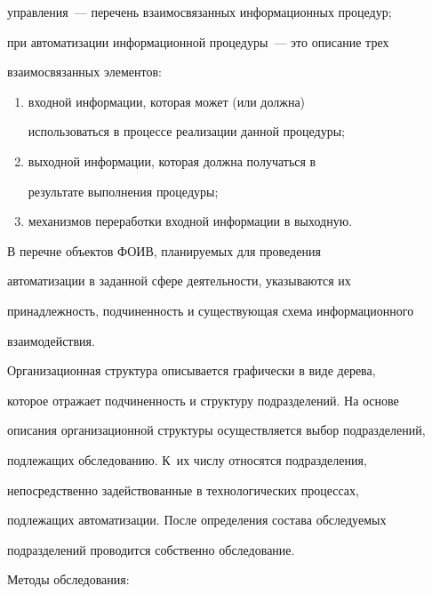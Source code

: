 управ\-ле\-ния~--- перечень взаимосвязанных информационных процедур; 


при автоматизации информационной процедуры~--- это описание трех 


взаимосвязанных элементов:


       \begin{enumerate}[(1)]


       \item входной информации, которая может (или должна) 


использоваться в процессе реализации данной процедуры;


       \item  выходной информации, которая должна получаться в 


результате выполнения процедуры;


       \item механизмов переработки входной информации в выходную.


       \end{enumerate}


       


      В перечне объектов ФОИВ, планируемых для проведения 


автоматизации в заданной сфере деятельности, указываются их 


принадлежность, подчиненность и существующая схема информационного 


взаимодействия.    


      


      Организационная структура описывается графически в виде дерева, 


которое отражает подчиненность и структуру подразделений. На основе 


описания организационной структуры осуществляется выбор подразделений, 


подлежащих обследованию. К~их числу относятся подразделения, 


непосредственно задействованные в технологических процессах, 


подлежащих автоматизации. После определения состава обследуемых 


подразделений проводится собственно обследование.


      


      Методы обследования:


